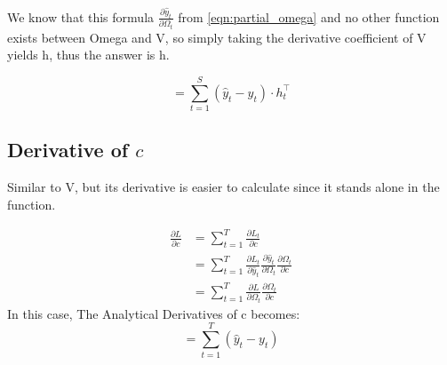 \documentclass{article}
\begin{document}
We know that this formula $\frac{\partial \hat{y}_{t}}{\partial \Omega_{t}}$ from \eqref{eqn:partial_omega} and no other function exists between Omega and V, so simply taking the derivative coefficient of V yields h, thus the answer is h.

\begin{equation}
\label{eqn:partial_aV}
=\sum_{t=1}^{S} (\hat{y}_{t} - y_{t}) \cdot h_{t}^\top
\end{equation}
\subsection{Derivative of $c$}
Similar to V, but its derivative is easier to calculate since it stands alone in the function.

\begin{align*}
\frac{\partial L}{\partial c} &= \sum_{t=1}^{T} \frac{\partial L_t}{\partial c} \\
&= \sum_{t=1}^{T} \frac{\partial L_{t}}{\partial \hat{y}_{t}} \frac{\partial \hat{y}_{t}}{\partial \Omega_{t}} \frac{\partial \Omega_{t}}{\partial c}\\
 &= \sum_{t=1}^{T} \frac{\partial L}{\partial \Omega_t} \frac{\partial \Omega_{t}}{\partial c}
\end{align*}
In this case, The Analytical Derivatives of c becomes:
\begin{equation}
\label{eqn:partial_ac}
   =\sum_{t=1}^{T} (\hat{y}_{t} - y_{t})
\end{equation}
\end{document}
